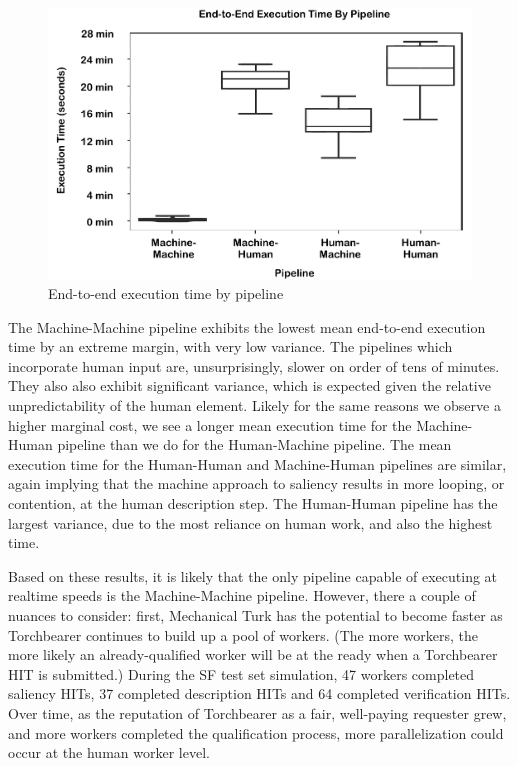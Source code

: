 \begin{figure}[htbp]
  \centering
  \includegraphics[width=\textwidth]{images/plot_executiontime.pdf}
  \caption{End-to-end execution time by pipeline}
  \label{fig:plot:executiontime}
\end{figure}

The Machine-Machine pipeline exhibits the lowest mean end-to-end execution time by an extreme margin, with very low variance. The pipelines which incorporate human input are, unsurprisingly, slower on order of tens of minutes. They also also exhibit significant variance, which is expected given the relative unpredictability of the human element. Likely for the same reasons we observe a higher marginal cost, we see a longer mean execution time for the Machine-Human pipeline than we do for the Human-Machine pipeline. The mean execution time for the Human-Human and Machine-Human pipelines are similar, again implying that the machine approach to saliency results in more looping, or contention, at the human description step. The Human-Human pipeline has the largest variance, due to the most reliance on human work, and also the highest time. 

Based on these results, it is likely that the only pipeline capable of executing at realtime speeds is the Machine-Machine pipeline. However, there a couple of nuances to consider: first, Mechanical Turk has the potential to become faster as Torchbearer continues to build up a pool of workers. (The more workers, the more likely an already-qualified worker will be at the ready when a Torchbearer HIT is submitted.) During the SF test set simulation, 47 workers completed saliency HITs, 37 completed description HITs and 64 completed verification HITs. Over time, as the reputation of Torchbearer as a fair, well-paying requester grew, and more workers completed the qualification process, more parallelization could occur at the human worker level.

